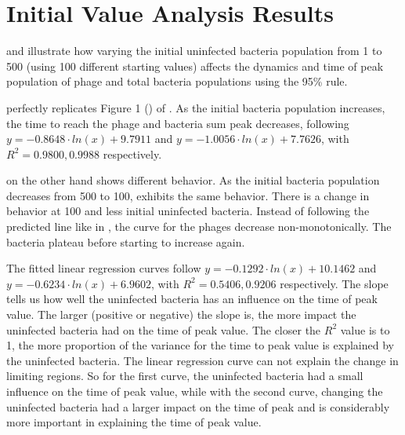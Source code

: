 \section{Initial Value Analysis Results}
\label{sec:results:initial_value_analysis}
 and  illustrate how varying the initial uninfected bacteria population from 1 to 500 (using 100 different starting values) affects the dynamics and time of peak population of phage and total bacteria populations using the 95\% rule. 

 perfectly replicates Figure 1 () of \citet{mullaExtremeDiversityPhage2024}. 
As the initial bacteria population increases, the time to reach the phage and bacteria sum peak decreases, following $y = -0.8648\cdot ln(x) + 9.7911$ and $y = -1.0056\cdot ln(x)+7.7626$, with $R^2=0.9800, 0.9988$ respectively. 

 on the other hand shows different behavior. 
As the initial bacteria population decreases from 500 to 100,  exhibits the same behavior. 
There is a change in behavior at 100 and less initial uninfected bacteria. 
Instead of following the predicted line like in , the curve for the phages decrease non-monotonically.
The bacteria plateau before starting to increase again. 

The fitted linear regression curves follow $y = -0.1292\cdot ln(x) + 10.1462$ and $y = -0.6234\cdot ln(x)+6.9602$, with $R^2=0.5406, 0.9206$ respectively. 
The slope tells us how well the uninfected bacteria has an influence on the time of peak value. 
The larger (positive or negative) the slope is, the more impact the uninfected bacteria had on the time of peak value. 
The closer the $R^2$ value is to 1, the more proportion of the variance for the time to peak value is explained by the uninfected bacteria. 
The linear regression curve can not explain the change in limiting regions. 
So for the first curve, the uninfected bacteria had a small influence on the time of peak value, while with the second curve, changing the uninfected bacteria had a larger impact on the time of peak and is considerably more important in explaining the time of peak value. 

